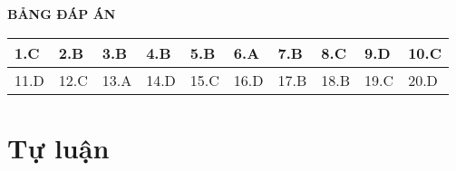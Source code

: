 \whiteBGstarEnd

\loigiai
{
	\begin{center}
		\textbf{BẢNG ĐÁP ÁN}
	\end{center}
	\begin{center}
		\begin{tabular}{|m{2.8em}|m{2.8em}|m{2.8em}|m{2.8em}|m{2.8em}|m{2.8em}|m{2.8em}|m{2.8em}|m{2.8em}|m{2.8em}|}
			\hline
			1.C  & 2.B  & 3.B  & 4.B  & 5.B  & 6.A  & 7.B  & 8.C  & 9.D  & 10.C  \\
			\hline
			11.D  & 12.C  & 13.A  & 14.D  & 15.C  & 16.D  & 17.B  & 18.B  & 19.C  & 20.D  \\
			\hline
			
		\end{tabular}
	\end{center}
}
\section{Tự luận}

